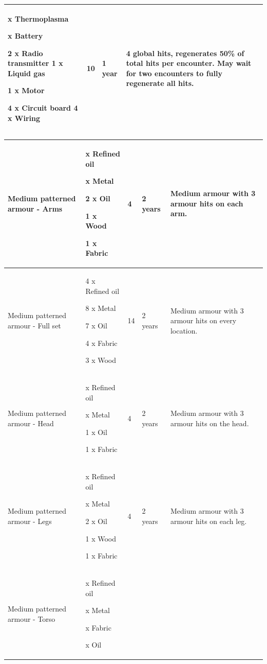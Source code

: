 \begin{table}
\begin{tabular}{|l|l|l|l|l|}
x Thermoplasma

x Battery

2 x Radio transmitter 1 x Liquid gas\par 1 x Motor\par 4 x Circuit board 4 x Wiring & 10 & 1 year & 4 global hits, regenerates 50\% of total hits per encounter. May wait for two encounters to fully regenerate all hits. \\
 \hline \end{tabular}

\end{table}

\begin{table}
\begin{tabular}{|l|l|l|l|l|} \hline 
Medium patterned armour - Arms &

x Refined oil

x Metal

2 x Oil\par 1 x Wood\par 1 x Fabric & 4 & 2 years & Medium armour with 3 armour hits on each arm. \\
 \hline Medium patterned armour - Full set & 4 x Refined oil\par 8 x Metal\par 7 x Oil\par 4 x Fabric\par 3 x Wood & 14 & 2 years & Medium armour with 3 armour hits on every location. \\
 \hline Medium patterned armour - Head &

x Refined oil

x Metal

1 x Oil\par 1 x Fabric & 4 & 2 years & Medium armour with 3 armour hits on the head. \\
 \hline Medium patterned armour - Legs &

x Refined oil

x Metal

2 x Oil\par 1 x Wood\par 1 x Fabric & 4 & 2 years & Medium armour with 3 armour hits on each leg. \\
 \hline Medium patterned armour - Torso &

x Refined oil

x Metal

x Fabric

x Oil


\end{tabular}
\end{table}
